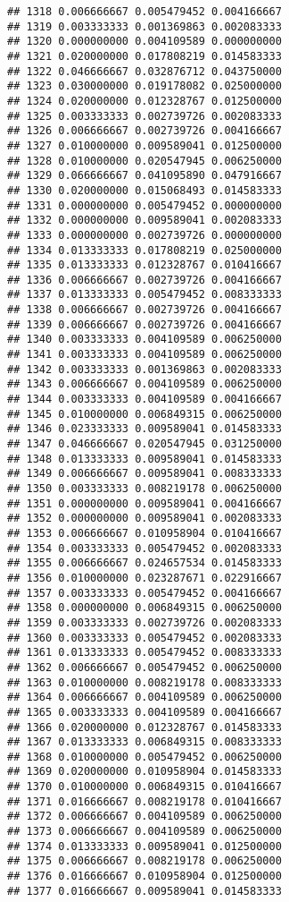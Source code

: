 \documentclass[
]{article}
\begin{document}
\begin{verbatim}
## 1318 0.006666667 0.005479452 0.004166667
## 1319 0.003333333 0.001369863 0.002083333
## 1320 0.000000000 0.004109589 0.000000000
## 1321 0.020000000 0.017808219 0.014583333
## 1322 0.046666667 0.032876712 0.043750000
## 1323 0.030000000 0.019178082 0.025000000
## 1324 0.020000000 0.012328767 0.012500000
## 1325 0.003333333 0.002739726 0.002083333
## 1326 0.006666667 0.002739726 0.004166667
## 1327 0.010000000 0.009589041 0.012500000
## 1328 0.010000000 0.020547945 0.006250000
## 1329 0.066666667 0.041095890 0.047916667
## 1330 0.020000000 0.015068493 0.014583333
## 1331 0.000000000 0.005479452 0.000000000
## 1332 0.000000000 0.009589041 0.002083333
## 1333 0.000000000 0.002739726 0.000000000
## 1334 0.013333333 0.017808219 0.025000000
## 1335 0.013333333 0.012328767 0.010416667
## 1336 0.006666667 0.002739726 0.004166667
## 1337 0.013333333 0.005479452 0.008333333
## 1338 0.006666667 0.002739726 0.004166667
## 1339 0.006666667 0.002739726 0.004166667
## 1340 0.003333333 0.004109589 0.006250000
## 1341 0.003333333 0.004109589 0.006250000
## 1342 0.003333333 0.001369863 0.002083333
## 1343 0.006666667 0.004109589 0.006250000
## 1344 0.003333333 0.004109589 0.004166667
## 1345 0.010000000 0.006849315 0.006250000
## 1346 0.023333333 0.009589041 0.014583333
## 1347 0.046666667 0.020547945 0.031250000
## 1348 0.013333333 0.009589041 0.014583333
## 1349 0.006666667 0.009589041 0.008333333
## 1350 0.003333333 0.008219178 0.006250000
## 1351 0.000000000 0.009589041 0.004166667
## 1352 0.000000000 0.009589041 0.002083333
## 1353 0.006666667 0.010958904 0.010416667
## 1354 0.003333333 0.005479452 0.002083333
## 1355 0.006666667 0.024657534 0.014583333
## 1356 0.010000000 0.023287671 0.022916667
## 1357 0.003333333 0.005479452 0.004166667
## 1358 0.000000000 0.006849315 0.006250000
## 1359 0.003333333 0.002739726 0.002083333
## 1360 0.003333333 0.005479452 0.002083333
## 1361 0.013333333 0.005479452 0.008333333
## 1362 0.006666667 0.005479452 0.006250000
## 1363 0.010000000 0.008219178 0.008333333
## 1364 0.006666667 0.004109589 0.006250000
## 1365 0.003333333 0.004109589 0.004166667
## 1366 0.020000000 0.012328767 0.014583333
## 1367 0.013333333 0.006849315 0.008333333
## 1368 0.010000000 0.005479452 0.006250000
## 1369 0.020000000 0.010958904 0.014583333
## 1370 0.010000000 0.006849315 0.010416667
## 1371 0.016666667 0.008219178 0.010416667
## 1372 0.006666667 0.004109589 0.006250000
## 1373 0.006666667 0.004109589 0.006250000
## 1374 0.013333333 0.009589041 0.012500000
## 1375 0.006666667 0.008219178 0.006250000
## 1376 0.016666667 0.010958904 0.012500000
## 1377 0.016666667 0.009589041 0.014583333

\end{verbatim}
\end{document}
